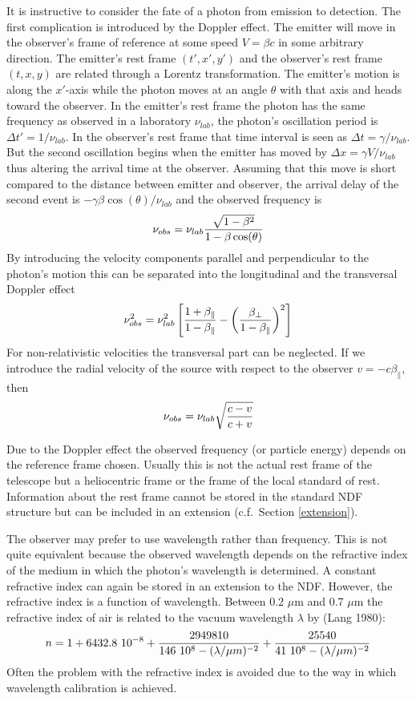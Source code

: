 It is instructive to consider the fate of a photon from emission to detection.
The first complication is introduced by the Doppler effect. The emitter will
move in the observer's frame of reference at some speed $V=\beta c$ in some
arbitrary direction. The emitter's rest frame $(t',x',y')$ and the observer's
rest frame $(t,x,y)$ are related through a Lorentz transformation. The
emitter's motion is along the $x'$-axis while the photon moves at an angle
$\theta$ with that axis and heads toward the observer. In the emitter's rest
frame the photon has the same frequency as observed in a laboratory
$\nu_{lab}$, the photon's oscillation period is $\Delta t'=1/\nu_{lab}$. In the
observer's rest frame that time interval is seen as $\Delta
t=\gamma/\nu_{lab}$. But the second oscillation begins when the emitter has
moved by $\Delta x=\gamma V/\nu_{lab}$ thus altering the arrival time at the
observer. Assuming that this move is short compared to the distance between
emitter and observer, the arrival delay of the second event is
$-\gamma\beta\cos(\theta)/\nu_{lab}$ and the observed frequency is
$$\nu_{obs}=\nu_{lab}{\sqrt{1-\beta^2}\over 1-\beta\cos(\theta)}$$
By introducing the velocity components parallel and perpendicular to the
photon's motion this can be separated into the longitudinal and the transversal
Doppler effect
$$\nu_{obs}^2=\nu_{lab}^2
   \left[{1+\beta_{\parallel}\over 1-\beta_{\parallel}}
         -\left({\beta_{\perp}\over 1-\beta_{\parallel}}\right)^2\right]$$
For non-relativistic velocities the transversal part can be neglected. If we
introduce the radial velocity of the source with respect to the observer
$v=-c\beta_{\parallel}$, then
$$\nu_{obs}=\nu_{lab}\sqrt{{c-v}\over{c+v}}$$

Due to the Doppler effect the observed frequency (or particle energy) depends
on the reference frame chosen. Usually this is not the actual rest frame of the
telescope but a heliocentric frame or the frame of the local standard of rest.
Information about the rest frame cannot be stored in the standard NDF structure
but can be included in an extension (c.f.\ Section \ref{extension}).

The observer may prefer to use wavelength rather than frequency. This is not
quite equivalent because the observed wavelength depends on the refractive
index of the medium in which the photon's wavelength is determined. A constant
refractive index can again be stored in an extension to the NDF. However, the
refractive index is a function of wavelength.
Between 0.2 $\mu$m and 0.7 $\mu$m the refractive index of air
is related to the vacuum wavelength $\lambda$ by (Lang 1980):
$$n = 1 + 6432.8\ 10^{-8}
        + {{2949810}\over{146\ 10^8 - (\lambda/\mu m)^{-2}}}
        + {{25540}\over{41\ 10^8 - (\lambda/\mu m)^{-2}}}$$
Often the problem with the refractive index is avoided due to the way in which
wavelength calibration is achieved.


